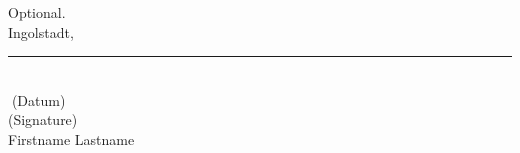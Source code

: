 


Optional.\\ 
	
Ingolstadt, \rule{0.3\textwidth}{0.4pt}	\\
\textcolor{white}{.}\qquad\qquad\qquad\qquad\quad \small (Datum) \\ [1.3cm]
	
(Signature) \\
Firstname Lastname
